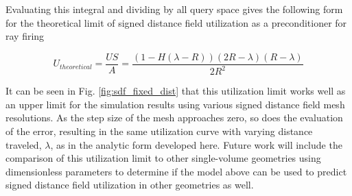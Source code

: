 Evaluating this integral and dividing by all query space gives the
following form for the theoretical limit of signed distance field utilization as a
preconditioner for ray firing

\begin{equation}
U_{theoretical} = \frac{US}{A} =  \frac{(1-H(\lambda-R))(2R-\lambda)(R-\lambda)}{2R^2}
\end{equation}

It can be seen in Fig. \ref{fig:sdf_fixed_dist} that this utilization limit
works well as an upper limit for the simulation results using various signed
distance field mesh resolutions. As the step size of the mesh approaches zero,
so does the evaluation of the error, resulting in the same utilization curve
with varying distance traveled, $\lambda$, as in the analytic form developed
here. Future work will include the comparison of this utilization limit to other
single-volume geometries using dimensionless parameters to determine if the
model above can be used to predict signed distance field utilization in other
geometries as well.




